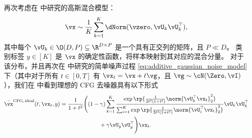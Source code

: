 \documentclass[../../book-main_zh.tex]{subfiles}
\begin{document}
\begin{example}\label{example:denoising-gaussian-mixture-cfg-parameterization}
    再次考虑在  中研究的高斯混合模型：
    \begin{equation}
        \vx \sim \frac{1}{K}\sum_{k = 1}^{K}\dNorm(\vzero,
        \vU_{k}\vU_{k}^{\top}),
    \end{equation}
    其中每个 \(\vU_{k} \in \O(D, P) \subseteq \R^{D \times P}\) 是一个具有正交列的矩阵，且 $P \ll D$。
    类别标签 $y \in [K]$ 是 $\vx$ 的确定性函数，将样本映射到其对应的混合分量。
    对于该分布，并且再次在  中研究的简单噪声过程 \eqref{eq:additive_gaussian_noise_model} 下（其中对于所有 $t \in [0, T]$ 有 $\vx_t = \vx + t \vg$，且 $\vg \sim \cN(\Zero, \vI)$），我们在  中看到理想的 CFG 去噪器具有以下形式
    \begin{equation}\label{eq:cfg-denoiser-mog-low-rank-3}
        \begin{split}
            \bar{\vx}^{\mathrm{CFG,\,ideal}}(t, \vx_t, y)
            =
            \frac{1}{1 + t^{2}}
            \Biggl(
                &(1 - \gamma)
                \sum_{k = 1}^{K}\frac{\exp\rp{\frac{1}{2t^{2}(1
                + t^{2})}\norm{\vU_{k}^{\top}\vx_t}_{2}^{2}}}{\sum_{i
                    = 1}^{K}\exp\rp{\frac{1}{2t^{2}(1
                                +
                t^{2})}\norm{\vU_{i}^{\top}\vx_t}_{2}^{2}}}\vU_{k}\vU_{k}^{\top}
                \\
                &\qquad+
                \gamma
                \vU_{y}\vU_{y}^{\top}
            \Biggr)
            \vx_t.
        \end{split}
    \end{equation}


\end{example}
\end{document}
